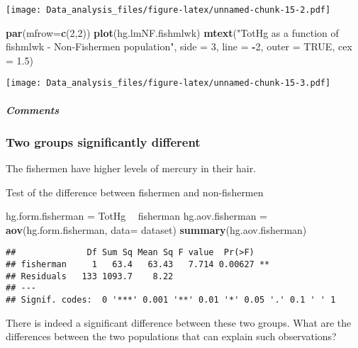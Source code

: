 \documentclass[12pt,]{article}
\newenvironment{Shaded}{\begin{snugshade}}{\end{snugshade}}
\newcommand{\KeywordTok}[1]{\textcolor[rgb]{0.13,0.29,0.53}{\textbf{#1}}}
\newcommand{\DataTypeTok}[1]{\textcolor[rgb]{0.13,0.29,0.53}{#1}}
\newcommand{\DecValTok}[1]{\textcolor[rgb]{0.00,0.00,0.81}{#1}}
\newcommand{\FloatTok}[1]{\textcolor[rgb]{0.00,0.00,0.81}{#1}}
\newcommand{\StringTok}[1]{\textcolor[rgb]{0.31,0.60,0.02}{#1}}
\newcommand{\OtherTok}[1]{\textcolor[rgb]{0.56,0.35,0.01}{#1}}
\newcommand{\OperatorTok}[1]{\textcolor[rgb]{0.81,0.36,0.00}{\textbf{#1}}}
\newcommand{\NormalTok}[1]{#1}
\let\oldsubparagraph\subparagraph
\renewcommand{\subparagraph}[1]{\oldsubparagraph{#1}\mbox{}}
\begin{document}
\texttt{[image: Data\_analysis\_files/figure-latex/unnamed-chunk-15-2.pdf]}

\begin{Shaded}
\begin{Highlighting}[]
\KeywordTok{par}\NormalTok{(}\DataTypeTok{mfrow=}\KeywordTok{c}\NormalTok{(}\DecValTok{2}\NormalTok{,}\DecValTok{2}\NormalTok{))}
\KeywordTok{plot}\NormalTok{(hg.lmNF.fishmlwk)}
\KeywordTok{mtext}\NormalTok{(}\StringTok{"TotHg as a function of fishmlwk - Non-Fishermen population"}\NormalTok{, }\DataTypeTok{side =} \DecValTok{3}\NormalTok{, }\DataTypeTok{line =} \OperatorTok{-}\DecValTok{2}\NormalTok{, }\DataTypeTok{outer =} \OtherTok{TRUE}\NormalTok{, }\DataTypeTok{cex =} \FloatTok{1.5}\NormalTok{)}
\end{Highlighting}
\end{Shaded}

\texttt{[image: Data\_analysis\_files/figure-latex/unnamed-chunk-15-3.pdf]}

\subparagraph{Comments}\label{comments-3}

\subsubsection{Two groups significantly
different}\label{two-groups-significantly-different}

The fishermen have higher levels of mercury in their hair.

Test of the difference between fishermen and non-fishermen

\begin{Shaded}
\begin{Highlighting}[]
\NormalTok{hg.form.fisherman =}\StringTok{ }\NormalTok{TotHg }\OperatorTok{~}\StringTok{ }\NormalTok{fisherman}
\NormalTok{hg.aov.fisherman =}\StringTok{ }\KeywordTok{aov}\NormalTok{(hg.form.fisherman, }\DataTypeTok{data=}\NormalTok{ dataset)}
\KeywordTok{summary}\NormalTok{(hg.aov.fisherman)}
\end{Highlighting}
\end{Shaded}

\begin{verbatim}
##              Df Sum Sq Mean Sq F value  Pr(>F)   
## fisherman     1   63.4   63.43   7.714 0.00627 **
## Residuals   133 1093.7    8.22                   
## ---
## Signif. codes:  0 '***' 0.001 '**' 0.01 '*' 0.05 '.' 0.1 ' ' 1
\end{verbatim}

There is indeed a significant difference between these two groups. What
are the differences between the two populations that can explain such
observations?
\end{document}
